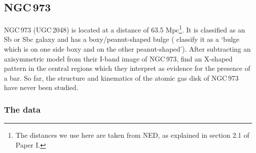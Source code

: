 \documentclass{aa}
\begin{document}
\subsection{NGC\,973}

NGC\,973 (UGC\,2048) is located at a distance of 63.5 Mpc\footnote{The distances we use here are taken from NED, as explained in section 2.1 of Paper I.}. It is classified as an Sb or Sbc galaxy and has a boxy/peanut-shaped bulge (\citealt{lutticke00} classify it as a `bulge which is on one side boxy and on the other peanut-shaped'). After subtracting an axisymmetric model from their I-band image of NGC\,973, \cite{patsis06} find an X-shaped pattern in the central regions which they interpret as evidence for the presence of a bar. So far, the structure and kinematics of the atomic gas disk of NGC\,973 have never been studied.

\subsubsection{The data}
\end{document}
